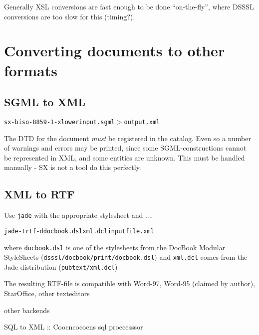 Generally XSL conversions are fast enough to be done ``on-the-fly'',
where DSSSL conversions are \textsf{too slow for this (timing?)}.



\section{Converting documents to other formats}
\label{sec:docbook-converting-documents-to-other-formats}


\subsection{SGML to XML}
\label{docbook-converting-sgml-to-xml}

\begin{alltt}
  sx -biso-8859-1 -xlower input.sgml $>$ output.xml
\end{alltt}

The DTD for the document \textit{must} be registered in the
\textsf{catalog}.  Even so a number of warnings and errors may be
printed, since some SGML-constructions cannot be represented in XML,
and some entities are unknown.  This must be handled manually - SX is
not a tool do this perfectly.


\subsection{XML to RTF}
\label{sec:docbook-xml-to-rtf}

Use \texttt{jade} with the appropriate stylesheet and \textsf{....}

\begin{alltt}
         jade -t rtf -d docbook.dsl xml.dcl inputfile.xml
\end{alltt}

where \texttt{docbook.dsl} is one of the stylesheets from the
\textsf{DocBook Modular StyleSheets}
(\texttt{dsssl/docbook/print/docbook.dsl}) and \texttt{xml.dcl} comes
from the Jade distribution (\texttt{pubtext/xml.dcl})

The resulting RTF-file is compatible with Word-97, Word-95 (claimed by
author), StarOffice, \textsf{other texteditors} 

\textsf{other backends}

SQL to XML :: Coocncococns sql proecesssor



